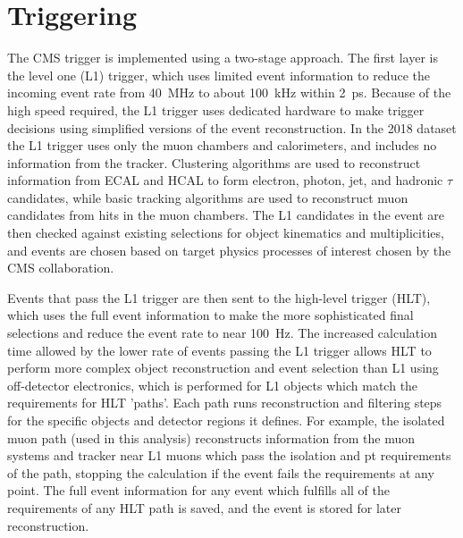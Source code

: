 \section{Triggering}
The CMS trigger is implemented using a two-stage approach. The first layer is the level one (L1) trigger, which uses limited event information to reduce the incoming event rate from \SI{40}{\mega\hertz} to about \SI{100}{\kilo\hertz} within \SI{2}{\pico\second}. 
Because of the high speed required, the L1 trigger uses dedicated hardware to make trigger decisions using simplified versions of the event reconstruction.
In the 2018 dataset the L1 trigger uses only the muon chambers and calorimeters, and includes no information from the tracker.
Clustering algorithms are used to reconstruct information from ECAL and HCAL to form electron, photon, jet, and hadronic $\tau$ candidates, while basic tracking algorithms are used to reconstruct muon candidates from hits in the muon chambers.
The L1 candidates in the event are then checked against existing selections for object kinematics and multiplicities, and events are chosen based on target physics processes of interest chosen by the CMS collaboration.

Events that pass the L1 trigger are then sent to the high-level trigger (HLT), which uses the full event information to make the more sophisticated final selections and reduce the event rate to near \SI{100}{\hertz}.
The increased calculation time allowed by the lower rate of events passing the L1 trigger allows HLT to perform more complex object reconstruction and event selection than L1 using off-detector electronics, which is performed for L1 objects which match the requirements for HLT 'paths'.
Each path runs reconstruction and filtering steps for the specific objects and detector regions it defines.
For example, the isolated muon path (used in this analysis) reconstructs information from the muon systems and tracker near L1 muons which pass the isolation and pt requirements of the path, stopping the calculation if the event fails the requirements at any point.
The full event information for any event which fulfills all of the requirements of any HLT path is saved, and the event is stored for later reconstruction.

